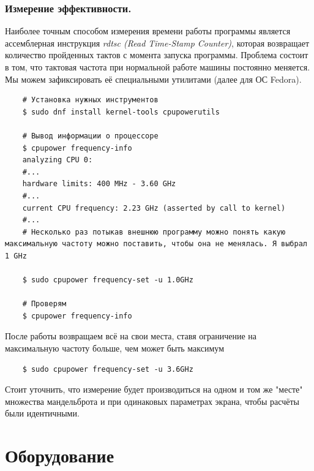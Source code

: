 \documentclass[12pt,a4paper]{article}
\begin{document}
\subsubsection{Измерение эффективности.}

Наиболее точным способом измерения времени работы программы является ассемблерная инструкция \textit{rdtsc (Read Time-Stamp Counter)}, которая возвращает количество пройденных тактов с момента запуска программы. Проблема состоит в том, что тактовая частота при нормальной работе машины постоянно меняется. Мы можем зафиксировать её специальными утилитами (далее для ОС Fedora).

\begin{verbatim}
    # Установка нужных инструментов
    $ sudo dnf install kernel-tools cpupowerutils

    # Вывод информации о процессоре
    $ cpupower frequency-info
    analyzing CPU 0:
    #...
    hardware limits: 400 MHz - 3.60 GHz
    #...
    current CPU frequency: 2.23 GHz (asserted by call to kernel)
    #...
    # Несколько раз потыкав внешнюю программу можно понять какую максимальную частоту можно поставить, чтобы она не менялась. Я выбрал 1 GHz

    $ sudo cpupower frequency-set -u 1.0GHz

    # Проверям
    $ cpupower frequency-info

\end{verbatim}

После работы возвращаем всё на свои места, ставя ограничение на максимальную частоту больше, чем может быть максимум

\begin{verbatim}
    $ sudo cpupower frequency-set -u 3.6GHz
\end{verbatim}

Стоит уточнить, что измерение будет производиться на одном и том же "месте" множества мандельброта и при одинаковых параметрах экрана, чтобы расчёты были идентичными.

\section{Оборудование}
\end{document}
